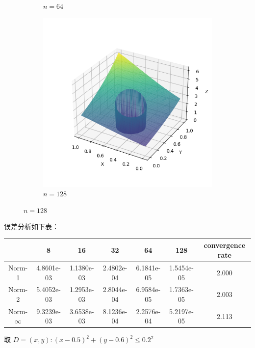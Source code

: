 \documentclass[lang=cn,a4paper,newtx,bibend=bibtex]{elegantpaper}
\begin{document}
\begin{figure}[H]
\begin{subfigure}[b]{0.18\textwidth}
      \caption{$n = 64$}
  \end{subfigure}
  \hfill
  \begin{subfigure}[b]{0.18\textwidth}
      \includegraphics[width=\textwidth]{../../res_bac/res-[data|1-Neumann-irregular-e128].png}
      \caption{$n = 128$}
  \end{subfigure}
\end{figure}

误差分析如下表：

\begin{table}[H]
  \centering
  \begin{tabular}{|c|c|c|c|c|c|c|}
  \hline
   & 8 & 16 & 32 & 64 & 128 & convergence rate \\
  \hline
  Norm-1 & 4.8601e-03 & 1.1380e-03 & 2.4802e-04 & 6.1841e-05 & 1.5454e-05 & 2.000 \\
  Norm-2 & 5.4052e-03 & 1.2953e-03 & 2.8044e-04 & 6.9584e-05 & 1.7363e-05 & 2.003 \\
  Norm-$\infty$ & 9.3239e-03 & 3.6538e-03 & 8.1236e-04 & 2.2576e-04 & 5.2197e-05 & 2.113 \\
  \hline
  \end{tabular}
  \end{table}


取 $D = {(x, y) : (x - 0.5)^2 + (y - 0.6)^2 \le 0.2^2}$
\end{document}
